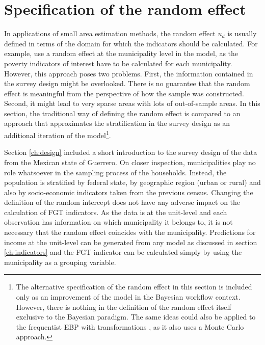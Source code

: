 \section{Specification of the random effect}
\label{ch:raneff}
In applications of small area estimation methods, the random effect $u_d$ is usually defined in terms of the domain for which the indicators should be calculated.
For example, \cite{rojas_perilla_data_2020} use a random effect at the municipality level in the model, as the poverty indicators of interest have to be calculated for each municipality.
However, this approach poses two problems.
First, the information contained in the survey design might be overlooked.
There is no guarantee that the random effect is meaningful from the perspective of how the sample was constructed.
Second, it might lead to very sparse areas with lots of out-of-sample areas.
In this section, the traditional way of defining the random effect is compared to an approach that approximates the stratification in the survey design as an additional iteration of the model\footnote{The alternative specification of the random effect in this section is included only as an improvement of the model in the Bayesian workflow context. However, there is nothing in the definition of the random effect itself exclusive to  the Bayesian paradigm. The same ideas could also be applied to the frequentist EBP with transformations \citep{rojas_perilla_data_2020}, as it also uses a Monte Carlo approach.}.

Section \ref{ch:design} included a short introduction to the survey design of the data from the Mexican state of Guerrero.
On closer inspection, municipalities play no role whatsoever in the sampling process of the households.
Instead, the population is stratified by federal state, by geographic region (urban or rural) and also by socio-economic indicators taken from the previous census.
Changing the definition of the random intercept does not have any adverse impact on the calculation of FGT indicators.
As the data is at the unit-level and each observation has information on which municipality it belongs to, it is not necessary that the random effect coincides with the municipality.
Predictions for income at the unit-level can be generated from any model as discussed in section \ref{ch:indicators} and the FGT indicator can be calculated simply by using the municipality as a grouping variable.

